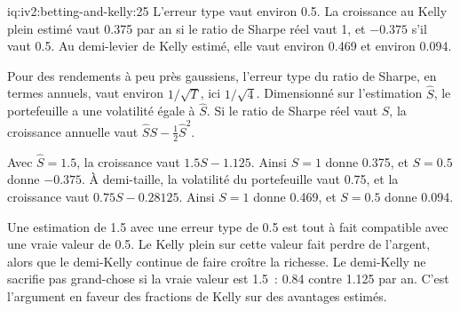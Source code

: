 \begin{solution}{iq:iv2:betting-and-kelly:25}
L'erreur type vaut environ 0.5. La croissance au Kelly plein estimé vaut 0.375 par an si le ratio de Sharpe réel vaut 1, et $-0.375$ s'il vaut 0.5. Au demi-levier de Kelly estimé, elle vaut environ 0.469 et environ 0.094.

Pour des rendements à peu près gaussiens, l'erreur type du ratio de Sharpe, en termes annuels, vaut environ $1/\sqrt{T}$, ici $1/\sqrt 4$. Dimensionné sur l'estimation $\hat S$, le portefeuille a une volatilité égale à $\hat S$. Si le ratio de Sharpe réel vaut $S$, la croissance annuelle vaut $\hat S S - \tfrac12\hat S^2$.

Avec $\hat S = 1.5$, la croissance vaut $1.5S - 1.125$. Ainsi $S = 1$ donne 0.375, et $S = 0.5$ donne $-0.375$. À demi-taille, la volatilité du portefeuille vaut 0.75, et la croissance vaut $0.75S - 0.28125$. Ainsi $S = 1$ donne 0.469, et $S = 0.5$ donne 0.094.

Une estimation de 1.5 avec une erreur type de 0.5 est tout à fait compatible avec une vraie valeur de 0.5. Le Kelly plein sur cette valeur fait perdre de l'argent, alors que le demi-Kelly continue de faire croître la richesse. Le demi-Kelly ne sacrifie pas grand-chose si la vraie valeur est 1.5~: 0.84 contre 1.125 par an. C'est l'argument en faveur des fractions de Kelly sur des avantages estimés.

\end{solution}

